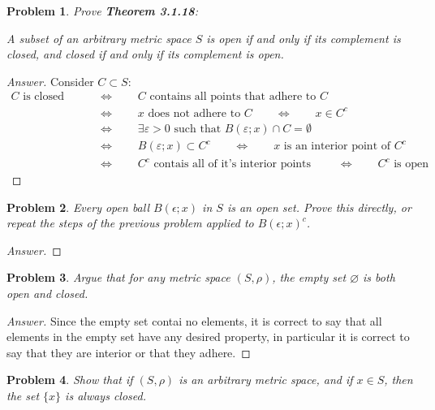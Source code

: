 \documentclass{article}
\newtheorem{problem}{Problem}[section]
\newcommand{\qiffq}{\qquad \iff \qquad}
\begin{document}
\begin{problem}
    Prove \textbf{Theorem 3.1.18}:

    A subset of an arbitrary metric space $S$ is open if and only if its complement is closed, and closed if and only if its complement is open.
\end{problem}

\begin{proof}[Answer]
    Consider $C\subset S$:
    \begin{align*}
        C\text{ is closed } &\qiffq C \text{ contains all points that adhere to } C \\
        &\qiffq x \text{ does not adhere to } C\qiffq x \in C^c \\
        &\qiffq \exists \varepsilon>0 \text{ such that } B(\varepsilon; x) \cap C = \emptyset\\
        &\qiffq B(\varepsilon; x) \subset C^c \qiffq x \text{ is an interior point of } C^c\\
        &\qiffq C^c \text{ contais all of it's interior points } \qiffq C^c \text{ is open}
    \end{align*}
\end{proof}

\begin{problem}
    Every open ball $B(\epsilon ; x)$ in $S$ is an open set. Prove this directly, or repeat the steps of the previous problem applied to $B(\epsilon ; x)^{c}$.
\end{problem}

\begin{proof}[Answer]
    
\end{proof}

\begin{problem}
Argue that for any metric space $(S, \rho)$, the empty set $\varnothing$ is both open and closed.
\end{problem}

\begin{proof}[Answer]
    Since the empty set contai no elements, it is correct to say that all elements in the empty set have any desired property, in particular it is correct to say that they are interior or that they adhere.
\end{proof}

\begin{problem}
Show that if $(S, \rho)$ is an arbitrary metric space, and if $x \in S$, then the set $\{x\}$ is always closed.
\end{problem}
\end{document}
